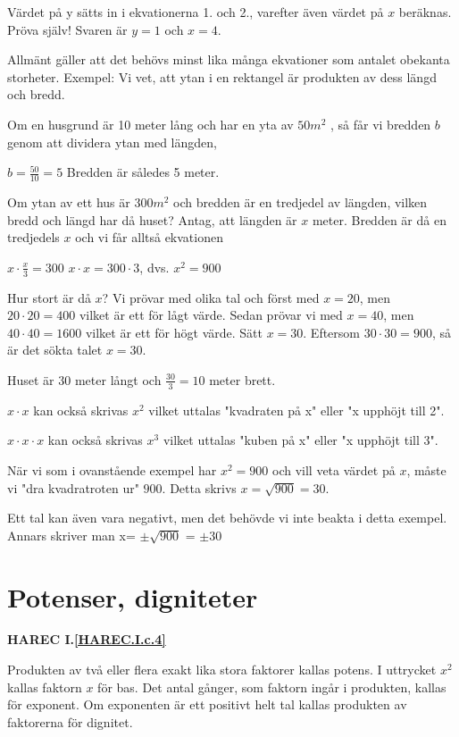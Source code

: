 Värdet på y sätts in i ekvationerna 1. och 2., varefter även värdet på \(x\)
beräknas.
Pröva själv! Svaren är \(y = 1\) och \(x = 4\).

Allmänt gäller att det behövs minst lika många ekvationer som antalet obekanta
storheter.
Exempel:
Vi vet, att ytan i en rektangel är produkten av dess längd och bredd.

Om en husgrund är 10 meter lång och har en yta av \(50 m^2\) , så får vi bredden
\(b\) genom att dividera ytan med längden,

\(b = \frac{50}{10} = 5\) Bredden är således 5 meter.

Om ytan av ett hus är \(300 m^2\) och bredden är en tredjedel av längden, vilken
bredd och längd har då huset?
Antag, att längden är \(x\) meter. Bredden är då en tredjedels \(x\) och vi får
alltså ekvationen

\(x \cdot \frac{x}{3} = 300\) \(x \cdot x = 300 \cdot 3\), dvs. \(x^2 = 900\)

Hur stort är då \(x\)?
Vi prövar med olika tal och först med \(x = 20\), men \(20 \cdot 20 = 400\) vilket
är ett för lågt värde. Sedan prövar vi med \(x = 40\), men \(40 \cdot 40 = 1600\)
vilket är ett för högt värde. Sätt \(x = 30\). Eftersom \(30 \cdot 30 = 900\), så är
det sökta talet \(x = 30\).

Huset är 30 meter långt och \(\frac{30}{3} = 10\) meter brett.

\(x \cdot x\) kan också skrivas \(x^2\) vilket uttalas "kvadraten på x" eller
"x upphöjt till 2".

\(x \cdot x \cdot x\) kan också skrivas \(x^3\) vilket uttalas "kuben på x" eller
"x upphöjt till 3".

När vi som i ovanstående exempel har \(x^2 = 900\) och vill veta värdet på \(x\),
måste vi "dra kvadratroten ur" \(900\).
Detta skrivs \(x = \sqrt{900} = 30\).

Ett tal kan även vara negativt, men det behövde vi inte beakta i detta exempel.
Annars skriver man x= \(\pm \sqrt{900}\) = \(\pm 30\)

\section{Potenser, digniteter}
\textbf{HAREC I.\ref{HAREC.I.c.4}\label{myHAREC.I.c.4}}

Produkten av två eller flera exakt lika stora faktorer kallas potens. I
uttrycket \(x^2\) kallas faktorn \(x\) för bas. Det antal gånger, som faktorn ingår
i produkten, kallas för exponent. Om exponenten är ett positivt helt tal
kallas produkten av faktorerna för dignitet.


